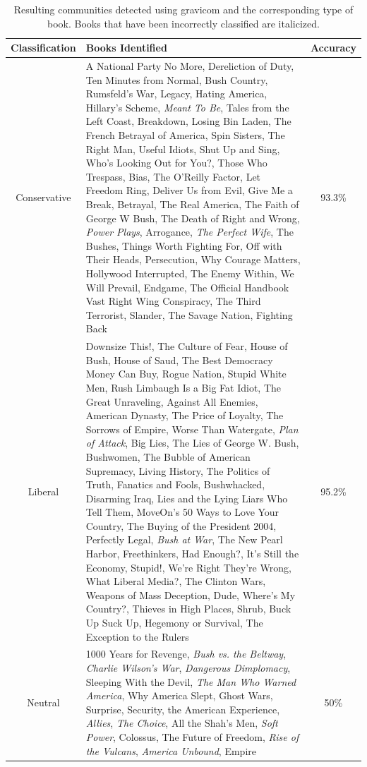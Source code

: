 \documentclass{article}\usepackage[]{graphicx}\usepackage[]{color}
\begin{document}
\begin{table}[H]
\centering
\begin{tabular}{cp{10cm}c}
  \hline
Classification & Books Identified & Accuracy \\ 
  \hline
Conservative & A National Party No More, Dereliction of Duty, Ten Minutes from Normal, Bush Country, Rumsfeld's War, Legacy, Hating America, Hillary's Scheme, {\it Meant To Be}, Tales from the Left Coast, Breakdown, Losing Bin Laden, The French Betrayal of America, Spin Sisters, The Right Man, Useful Idiots, Shut Up and Sing, Who's Looking Out for You?, Those Who Trespass, Bias, The O'Reilly Factor, Let Freedom Ring, Deliver Us from Evil, Give Me a Break, Betrayal, The Real America, The Faith of George W Bush, The Death of Right and Wrong, {\it Power Plays}, Arrogance, {\it The Perfect Wife}, The Bushes, Things Worth Fighting For, Off with Their Heads, Persecution, Why Courage Matters, Hollywood Interrupted, The Enemy Within, We Will Prevail, Endgame, The Official Handbook Vast Right Wing Conspiracy, The Third Terrorist, Slander, The Savage Nation, Fighting Back & 93.3\% \\ 
  Liberal & Downsize This!, The Culture of Fear, House of Bush, House of Saud, The Best Democracy Money Can Buy, Rogue Nation, Stupid White Men, Rush Limbaugh Is a Big Fat Idiot, The Great Unraveling, Against All Enemies, American Dynasty, The Price of Loyalty, The Sorrows of Empire, Worse Than Watergate, {\it Plan of Attack}, Big Lies, The Lies of George W. Bush, Bushwomen, The Bubble of American Supremacy, Living History, The Politics of Truth, Fanatics and Fools, Bushwhacked, Disarming Iraq, Lies and the Lying Liars Who Tell Them, MoveOn's 50 Ways to Love Your Country, The Buying of the President 2004, Perfectly Legal, {\it Bush at War}, The New Pearl Harbor, Freethinkers, Had Enough?, It's Still the Economy, Stupid!, We're Right They're Wrong, What Liberal Media?, The Clinton Wars, Weapons of Mass Deception, Dude, Where's My Country?, Thieves in High Places, Shrub, Buck Up Suck Up, Hegemony or Survival, The Exception to the Rulers & 95.2\% \\ 
  Neutral & 1000 Years for Revenge, {\it Bush vs. the Beltway}, {\it Charlie Wilson's War}, {\it Dangerous Dimplomacy}, Sleeping With the Devil, {\it The Man Who Warned America}, Why America Slept, Ghost Wars, Surprise, Security, the American Experience, {\it Allies}, {\it The Choice}, All the Shah's Men, {\it Soft Power}, Colossus, The Future of Freedom, {\it Rise of the Vulcans}, {\it America Unbound}, Empire & 50\% \\ 
   \hline
\end{tabular}
\caption{Resulting communities detected using gravicom and the corresponding type of book. Books that have been incorrectly classified are italicized.} 
\label{tab:polbooks_final}
\end{table}
\end{document}
